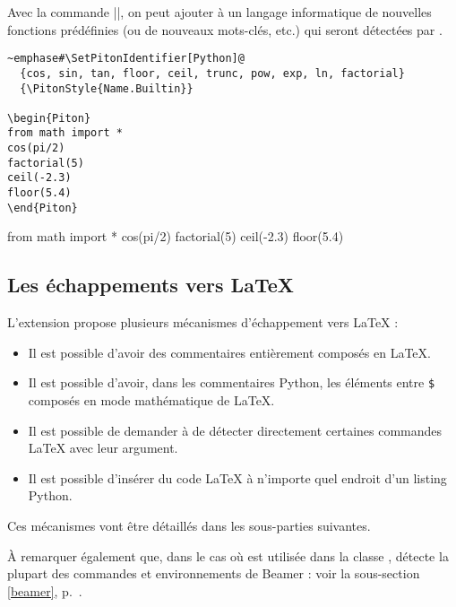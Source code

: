 \documentclass[dvipsnames,svgnames]{article}
\begin{document}
\endgroup

\bigskip
Avec la commande |\SetPitonIdentifiers|, on peut ajouter à un langage informatique de nouvelles fonctions
prédéfinies (ou de nouveaux mots-clés, etc.) qui seront détectées par .


\begin{Verbatim}
~emphase#\SetPitonIdentifier[Python]@
  {cos, sin, tan, floor, ceil, trunc, pow, exp, ln, factorial}
  {\PitonStyle{Name.Builtin}}

\begin{Piton}
from math import *
cos(pi/2) 
factorial(5)
ceil(-2.3) 
floor(5.4) 
\end{Piton}
\end{Verbatim}

\begingroup

  {}
 
\begin{Piton}
from math import *
cos(pi/2) 
factorial(5)
ceil(-2.3) 
floor(5.4) 
\end{Piton}


\endgroup

\subsection{Les échappements vers LaTeX}


L'extension  propose plusieurs mécanismes d'échappement vers LaTeX :
\begin{itemize}
\item Il est possible d'avoir des commentaires entièrement composés en LaTeX.
\item Il est possible d'avoir, dans les commentaires Python, les éléments entre \texttt{\$} composés en mode
mathématique de LaTeX.
\item Il est possible de demander à  de détecter directement certaines commandes LaTeX avec leur argument.
\item Il est possible d'insérer du code LaTeX à n'importe quel endroit d'un listing Python.
\end{itemize}
Ces mécanismes vont être détaillés dans les sous-parties suivantes.

\smallskip
À remarquer également que, dans le cas où  est utilisée dans la classe ,  détecte
la plupart des commandes et environnements de Beamer : voir la sous-section \ref{beamer}, p.~\pageref{beamer}.
\end{document}
